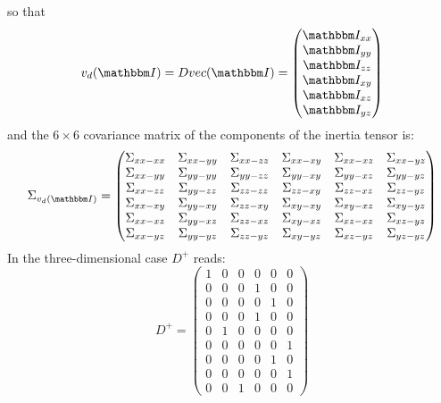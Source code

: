 \documentclass[a4paper,11pt]{article}
\newcommand{\itm}{\mathbbm I}
\newcommand{\itc}[1]{\itm_{#1}}
\begin{document}
so that 
\begin{equation}
  v_d(\itm) = D vec(\itm) =
  \begin{pmatrix}
    \itc{xx}\\
    \itc{yy}\\
    \itc{zz}\\
    \itc{xy}\\
    \itc{xz}\\
    \itc{yz}
  \end{pmatrix}
\end{equation}
and the $6\times6$ covariance matrix of the components of the inertia tensor
is:
\begin{equation}
  \Sigma_{v_d(\itm)} = 
  \begin{pmatrix}
    \Sigma_{xx-xx} & \Sigma_{xx-yy} & \Sigma_{xx-zz} &
    \Sigma_{xx-xy} & \Sigma_{xx-xz} & \Sigma_{xx-yz}\\
    \Sigma_{xx-yy} & \Sigma_{yy-yy} & \Sigma_{yy-zz} &
    \Sigma_{yy-xy} & \Sigma_{yy-xz} & \Sigma_{yy-yz}\\
    \Sigma_{xx-zz} & \Sigma_{yy-zz} & \Sigma_{zz-zz} &
    \Sigma_{zz-xy} & \Sigma_{zz-xz} & \Sigma_{zz-yz}\\
    \Sigma_{xx-xy} & \Sigma_{yy-xy} & \Sigma_{zz-xy} &
    \Sigma_{xy-xy} & \Sigma_{xy-xz} & \Sigma_{xy-yz}\\
    \Sigma_{xx-xz} & \Sigma_{yy-xz} & \Sigma_{zz-xz} &
    \Sigma_{xy-xz} & \Sigma_{xz-xz} & \Sigma_{xz-yz}\\
    \Sigma_{xx-yz} & \Sigma_{yy-yz} & \Sigma_{zz-yz} &
    \Sigma_{xy-yz} & \Sigma_{xz-yz} & \Sigma_{yz-yz}\\
  \end{pmatrix}
\end{equation}
In the three-dimensional case $D^+$ reads:
\begin{equation}
  D^+ =
  \begin{pmatrix}
    1 & 0 & 0 & 0 & 0 & 0\\
    0 & 0 & 0 & 1 & 0 & 0\\
    0 & 0 & 0 & 0 & 1 & 0\\
    0 & 0 & 0 & 1 & 0 & 0\\
    0 & 1 & 0 & 0 & 0 & 0\\
    0 & 0 & 0 & 0 & 0 & 1\\
    0 & 0 & 0 & 0 & 1 & 0\\
    0 & 0 & 0 & 0 & 0 & 1\\
    0 & 0 & 1 & 0 & 0 & 0
  \end{pmatrix}
\end{equation}
\end{document}

